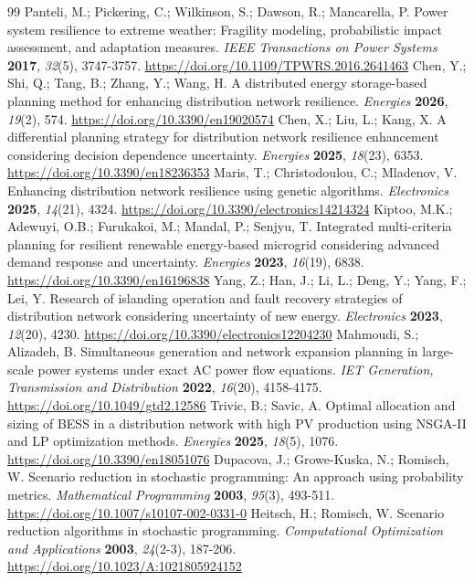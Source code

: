 \documentclass[energies,article,submit,moreauthors]{Definitions/mdpi}
\begin{document}
\begin{thebibliography}{99}
 Panteli, M.; Pickering, C.; Wilkinson, S.; Dawson, R.; Mancarella, P. Power system resilience to extreme weather: Fragility modeling, probabilistic impact assessment, and adaptation measures. \emph{IEEE Transactions on Power Systems} \textbf{2017}, \emph{32}(5), 3747-3757. \url{https://doi.org/10.1109/TPWRS.2016.2641463}
 Chen, Y.; Shi, Q.; Tang, B.; Zhang, Y.; Wang, H. A distributed energy storage-based planning method for enhancing distribution network resilience. \emph{Energies} \textbf{2026}, \emph{19}(2), 574. \url{https://doi.org/10.3390/en19020574}
 Chen, X.; Liu, L.; Kang, X. A differential planning strategy for distribution network resilience enhancement considering decision dependence uncertainty. \emph{Energies} \textbf{2025}, \emph{18}(23), 6353. \url{https://doi.org/10.3390/en18236353}
 Maris, T.; Christodoulou, C.; Mladenov, V. Enhancing distribution network resilience using genetic algorithms. \emph{Electronics} \textbf{2025}, \emph{14}(21), 4324. \url{https://doi.org/10.3390/electronics14214324}
 Kiptoo, M.K.; Adewuyi, O.B.; Furukakoi, M.; Mandal, P.; Senjyu, T. Integrated multi-criteria planning for resilient renewable energy-based microgrid considering advanced demand response and uncertainty. \emph{Energies} \textbf{2023}, \emph{16}(19), 6838. \url{https://doi.org/10.3390/en16196838}
 Yang, Z.; Han, J.; Li, L.; Deng, Y.; Yang, F.; Lei, Y. Research of islanding operation and fault recovery strategies of distribution network considering uncertainty of new energy. \emph{Electronics} \textbf{2023}, \emph{12}(20), 4230. \url{https://doi.org/10.3390/electronics12204230}
 Mahmoudi, S.; Alizadeh, B. Simultaneous generation and network expansion planning in large-scale power systems under exact AC power flow equations. \emph{IET Generation, Transmission and Distribution} \textbf{2022}, \emph{16}(20), 4158-4175. \url{https://doi.org/10.1049/gtd2.12586}
 Trivic, B.; Savic, A. Optimal allocation and sizing of BESS in a distribution network with high PV production using NSGA-II and LP optimization methods. \emph{Energies} \textbf{2025}, \emph{18}(5), 1076. \url{https://doi.org/10.3390/en18051076}
 Dupacova, J.; Growe-Kuska, N.; Romisch, W. Scenario reduction in stochastic programming: An approach using probability metrics. \emph{Mathematical Programming} \textbf{2003}, \emph{95}(3), 493-511. \url{https://doi.org/10.1007/s10107-002-0331-0}
 Heitsch, H.; Romisch, W. Scenario reduction algorithms in stochastic programming. \emph{Computational Optimization and Applications} \textbf{2003}, \emph{24}(2-3), 187-206. \url{https://doi.org/10.1023/A:1021805924152}

\end{thebibliography}
\end{document}
